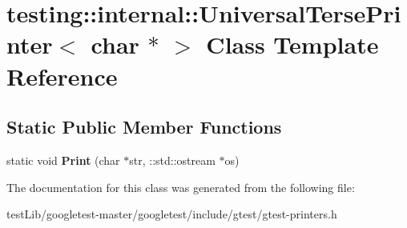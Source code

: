 \hypertarget{classtesting_1_1internal_1_1UniversalTersePrinter_3_01char_01_5_01_4}{}\section{testing\+:\+:internal\+:\+:Universal\+Terse\+Printer$<$ char $\ast$ $>$ Class Template Reference}
\label{classtesting_1_1internal_1_1UniversalTersePrinter_3_01char_01_5_01_4}
\subsection*{Static Public Member Functions}
\begin{DoxyCompactItemize}
\item 
\mbox{\label{classtesting_1_1internal_1_1UniversalTersePrinter_3_01char_01_5_01_4_aa9ef95587c1461fe33e254af52401a43}} 
static void {\bfseries Print} (char $\ast$str, \+::std\+::ostream $\ast$os)
\end{DoxyCompactItemize}


The documentation for this class was generated from the following file\+:\begin{DoxyCompactItemize}
\item 
test\+Lib/googletest-\/master/googletest/include/gtest/gtest-\/printers.\+h\end{DoxyCompactItemize}
